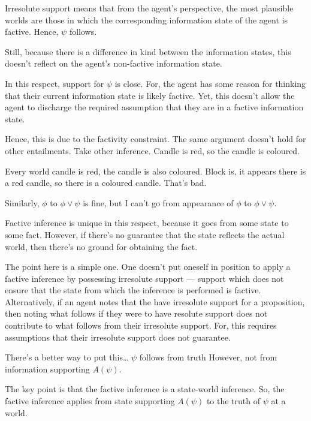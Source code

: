 \documentclass[10pt]{article}
\newcommand{\hozline}[0]{%
  \noindent\hdashrule[0.5ex][c]{\textwidth}{.1pt}{}
}
\begin{document}
\begin{note}
  Irresolute support means that from the agent's perspective, the most plausible worlds are those in which the corresponding information state of the agent is factive.
  Hence, \(\psi\) follows.

  Still, because there is a difference in kind between the information states, this doesn't reflect on the agent's non-factive information state.

  In this respect, support for \(\psi\) is close.
  For, the agent has some reason for thinking that their current information state is likely factive.
  Yet, this doesn't allow the agent to discharge the required assumption that they are in a factive information state.


\hozline



  

  Hence, this is due to the factivity constraint.
  The same argument doesn't hold for other entailments.
  Take other inference.
  Candle is red, so the candle is coloured.

  Every world candle is red, the candle is also coloured.
  Block is, it appears there is a red candle, so there is a coloured candle.
  That's bad.

  Similarly, \(\phi\) to \(\phi \lor \psi\) is fine, but I can't go from appearance of \(\phi\) to \(\phi \lor \psi\).

  Factive inference is unique in this respect, because it goes from some state to some fact.
  However, if there's no guarantee that the state reflects the actual world, then there's no ground for obtaining the fact.
\end{note}

\begin{note}[Summarising]
  The point here is a simple one.
  One doesn't put oneself in position to apply a factive inference by possessing irresolute support --- support which does not ensure that the state from which the inference is performed is factive.
  Alternatively, if an agent notes that the have irresolute support for a proposition, then noting what follows if they were to have resolute support does not contribute to what follows from their irresolute support.
  For, this requires assumptions that their irresolute support does not guarantee.

  {
    \color{red}
    There's a better way to put this\dots
    \(\psi\) follows from truth
    However, not from information supporting \(A(\psi)\).

    The key point is that the factive inference is a state-world inference.
    So, the factive inference applies from state supporting \(A(\psi)\) to the truth of \(\psi\) at a world.
  }
\end{note}
\end{document}
